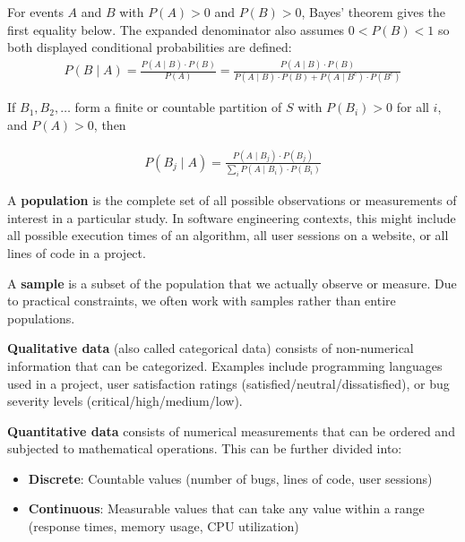 \begin{theorem}
    For events $A$ and $B$ with $P(A)>0$ and $P(B)>0$, Bayes' theorem gives the first equality below. The expanded denominator also assumes $0<P(B)<1$ so both displayed conditional probabilities are defined:
    \begin{align*}
    P(B \mid A) = \frac{P(A \mid B) \cdot P(B)}{P(A)}
     = \frac{P(A \mid B) \cdot P(B)}{P(A \mid B) \cdot P(B) + P(A \mid B^c) \cdot P(B^c)}
    \end{align*}

    If $B_1,B_2,\ldots$ form a finite or countable partition of $S$ with $P(B_i)>0$ for all $i$, and $P(A)>0$, then

    \begin{align*}
    P\left(B_j \mid A\right) = \frac{P\left(A \mid B_j\right) \cdot P\left(B_j\right)}{\sum_i P\left(A \mid B_i\right) \cdot P\left(B_i\right)}
    \end{align*}
\end{theorem}


\begin{definition}[Population]
A \textbf{population} is the complete set of all possible observations or measurements of interest in a particular study. In software engineering contexts, this might include all possible execution times of an algorithm, all user sessions on a website, or all lines of code in a project.
\end{definition}

\begin{definition}[Sample]
A \textbf{sample} is a subset of the population that we actually observe or measure. Due to practical constraints, we often work with samples rather than entire populations.
\end{definition}

\begin{definition}
\textbf{Qualitative data} (also called categorical data) consists of non-numerical information that can be categorized. Examples include programming languages used in a project, user satisfaction ratings (satisfied/neutral/dissatisfied), or bug severity levels (critical/high/medium/low).
\end{definition}

\begin{definition}
\textbf{Quantitative data} consists of numerical measurements that can be ordered and subjected to mathematical operations. This can be further divided into:
\begin{itemize}
    \item \textbf{Discrete}: Countable values (number of bugs, lines of code, user sessions)
    \item \textbf{Continuous}: Measurable values that can take any value within a range (response times, memory usage, CPU utilization)
\end{itemize}
\end{definition}

